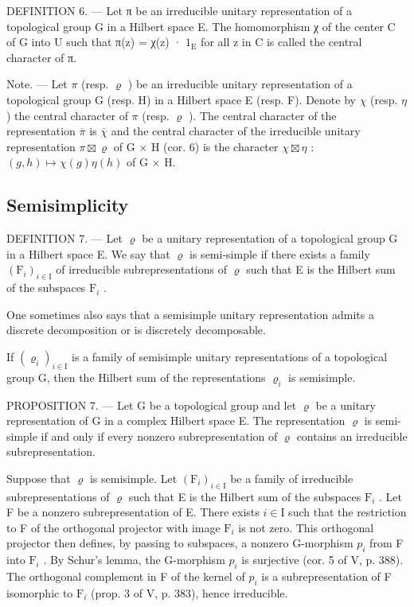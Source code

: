 DEFINITION 6. --- Let π be an irreducible unitary representation of a topological group G in a Hilbert space E. The homomorphism χ of the center C of G into U such that π(z) = χ(z) · \(1_{\mathrm{E}}\) for all z in C is called the central character of π.

Note. --- Let \(\pi\) (resp. \(\varrho\) ) be an irreducible unitary representation of a topological group G (resp. H) in a Hilbert space E (resp. F). Denote by \(\chi\) (resp. \(\eta\) ) the central character of \(\pi\) (resp. \(\varrho\) ). The central character of the representation \(\overline{\pi}\) is \(\overline{\chi}\) and the central character of the irreducible unitary representation \(\pi \boxtimes \varrho\) of G × H (cor. 6) is the character \(\chi \boxtimes \eta\) : \((g, h) \mapsto \chi(g)\eta(h)\) of G × H.

\subsection{Semisimplicity}

DEFINITION 7. --- Let \(\varrho\) be a unitary representation of a topological group G in a Hilbert space E. We say that \(\varrho\) is semi-simple if there exists a family \((\mathrm{F}_i)_{i\in \mathrm{I}}\) of irreducible subrepresentations of \(\varrho\) such that E is the Hilbert sum of the subspaces \(\mathrm{F}_i\) .

One sometimes also says that a semisimple unitary representation admits a discrete decomposition or is discretely decomposable.

If \((\varrho_{i})_{i\in\mathrm{I}}\) is a family of semisimple unitary representations of a topological group G, then the Hilbert sum of the representations \(\varrho_{i}\) is semisimple.

PROPOSITION 7. --- Let G be a topological group and let \(\varrho\) be a unitary representation of G in a complex Hilbert space E. The representation \(\varrho\) is semi-simple if and only if every nonzero subrepresentation of \(\varrho\) contains an irreducible subrepresentation.

Suppose that \(\varrho\) is semisimple. Let \((\mathrm{F}_i)_{i\in \mathrm{I}}\) be a family of irreducible subrepresentations of \(\varrho\) such that E is the Hilbert sum of the subspaces \(\mathrm{F}_i\) . Let F be a nonzero subrepresentation of E. There exists \(i\in \mathrm{I}\) such that the restriction to F of the orthogonal projector with image \(\mathrm{F}_i\) is not zero. This orthogonal projector then defines, by passing to subspaces, a nonzero G-morphism \(p_i\) from F into \(\mathrm{F}_i\) . By Schur's lemma, the G-morphism \(p_i\) is surjective (cor. 5 of V, p. 388). The orthogonal complement in F of the kernel of \(p_i\) is a subrepresentation of F isomorphic to \(\mathrm{F}_i\) (prop. 3 of V, p. 383), hence irreducible.

